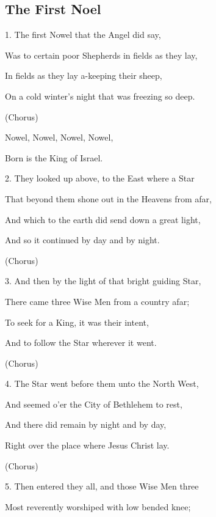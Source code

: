 \subsection{The First Noel}\label{the_first_noel}
\begin{description}[nosep,leftmargin=\parindent,labelsep=0pt]
\item 1. The first Nowel that the Angel did say, 
\item Was to certain poor Shepherds in fields as they lay, 
\item In fields as they lay a-keeping their sheep, 
\item On a cold winter's night that was freezing so deep. 
\vspace{1.5ex}
\item (Chorus) 
\item Nowel, Nowel, Nowel, Nowel, 
\item Born is the King of Israel. 
\vspace{1.5ex}
\item 2. They looked up above, to the East where a Star 
\item That beyond them shone out in the Heavens from afar, 
\item And which to the earth did send down a great light, 
\item And so it continued by day and by night. 
\item (Chorus) 
\vspace{1.5ex}
\item 3. And then by the light of that bright guiding Star, 
\item There came three Wise Men from a country afar; 
\item To seek for a King, it was their intent, 
\item And to follow the Star wherever it went. 
\item (Chorus) 
\vspace{1.5ex}
\item 4. The Star went before them unto the North West, 
\item And seemed o'er the City of Bethlehem to rest, 
\item And there did remain by night and by day, 
\item Right over the place where Jesus Christ lay. 
\item (Chorus) 
\vspace{1.5ex}
\item 5. Then entered they all, and those Wise Men three 
\item Most reverently worshiped with low bended knee; 

\end{description}

